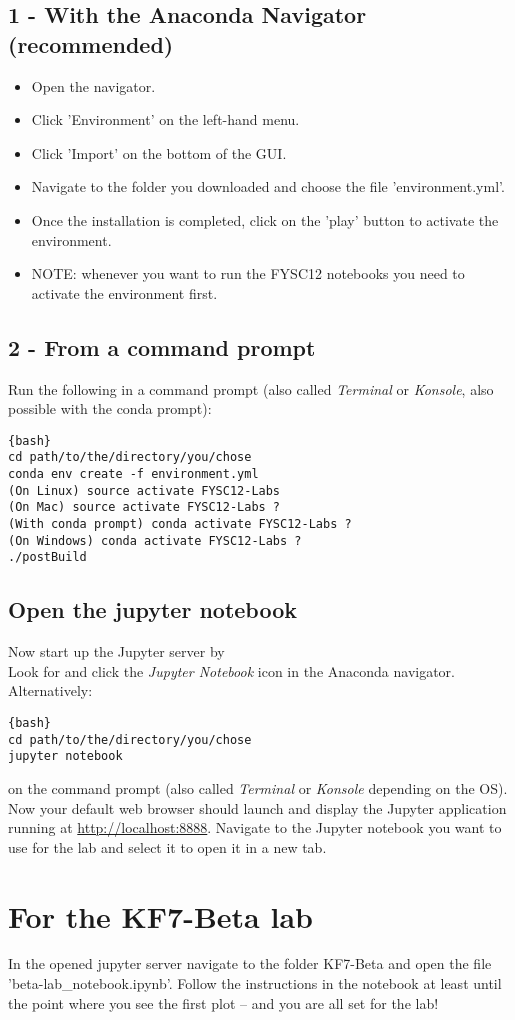 \documentclass[a4,11pt, notitlepage]{article}
\begin{document}
\newpage
\subsection*{1 - With the Anaconda Navigator (recommended)}
\begin{itemize}
  \item Open the navigator.
  \item Click 'Environment' on the left-hand menu.
  \item Click 'Import' on the bottom of the GUI.
  \item Navigate to the folder you downloaded and choose the file 'environment.yml'.
  \item Once the installation is completed, click on the 'play' button to activate the environment.
  \item NOTE: whenever you want to run the FYSC12 notebooks you need to activate the environment first.
\end{itemize}

\subsection*{2 - From a command prompt}

Run the following in a command prompt (also called \emph{Terminal} or \emph{Konsole}, also possible with the conda prompt):

\begin{lstlisting}{bash}
cd path/to/the/directory/you/chose
conda env create -f environment.yml
(On Linux) source activate FYSC12-Labs
(On Mac) source activate FYSC12-Labs ?
(With conda prompt) conda activate FYSC12-Labs ?
(On Windows) conda activate FYSC12-Labs ?
./postBuild
\end{lstlisting}


\subsection*{Open the jupyter notebook}
Now start up the Jupyter server by \\


Look for and click the \emph{Jupyter Notebook} icon in the Anaconda navigator. \\


Alternatively:
\begin{lstlisting}{bash}
cd path/to/the/directory/you/chose
jupyter notebook
\end{lstlisting}
on the command prompt (also called \emph{Terminal} or \emph{Konsole}
depending on the OS). \\

Now your default web browser should launch and display the Jupyter application
running at \url{http://localhost:8888}. Navigate to the Jupyter notebook you
want to use for the lab and select it to open it in a new tab.

\section*{For the KF7-Beta lab}
In the opened jupyter server navigate to the folder KF7-Beta and open the file 'beta-lab\_notebook.ipynb'.
Follow the instructions in the notebook at least until the point where you see the first plot -- and you are all set for the lab!
\end{document}
